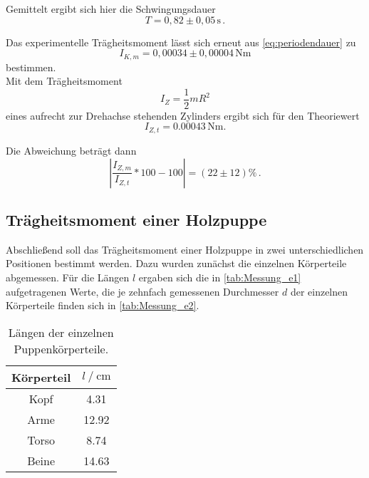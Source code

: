Gemittelt ergibt sich hier die Schwingungsdauer
\begin{equation*}
  T = 0,82 \pm 0,05 \, \unit{\second} \,.
\end{equation*}

Das experimentelle Trägheitsmoment lässt sich erneut aus \eqref{eq:periodendauer} zu
\begin{equation*}
  I_{K,m} = 0,00034 \pm 0,00004 \, \unit{\newton\meter}
\end{equation*} 
bestimmen. \\

Mit dem Trägheitsmoment
\begin{equation}
  I_Z = \frac{1}{2} m R^2
\end{equation}
eines aufrecht zur Drehachse stehenden Zylinders ergibt sich für den Theoriewert
\begin{equation*}
  I_{Z,t} = 0.00043 \,  \unit{\newton\meter}.
\end{equation*}

Die Abweichung beträgt dann
\begin{equation*}
  \left|\frac{I_{Z,m}}{I_{Z,t}} * 100 - 100 \right| = (22 \pm 12) \% \,.
\end{equation*}

\subsection{Trägheitsmoment einer Holzpuppe}
\label{subsec:e}

Abschließend soll das Trägheitsmoment einer Holzpuppe in zwei unterschiedlichen Positionen bestimmt werden. Dazu wurden zunächst die einzelnen Körperteile abgemessen.
Für die Längen $l$ ergaben sich die in \autoref{tab:Messung_e1} aufgetragenen Werte, die je zehnfach gemessenen Durchmesser $d$ der einzelnen Körperteile finden sich in \autoref{tab:Messung_e2}.

\begin{table}[H]
  \centering
  \begin{tabular}{S[table-format=2.0] S[table-format=2.2]}
      \toprule
      {Körperteil} & {$l \mathbin{/} \unit{\centi\meter}$}\\
      \midrule
        {Kopf}  & 4.31  \\
        {Arme}  & 12.92 \\
        {Torso} & 8.74 \\
        {Beine} & 14.63 \\
      \bottomrule
  \end{tabular}
  \caption{Längen der einzelnen Puppenkörperteile.}
  \label{tab:Messung_e1}
\end{table}

